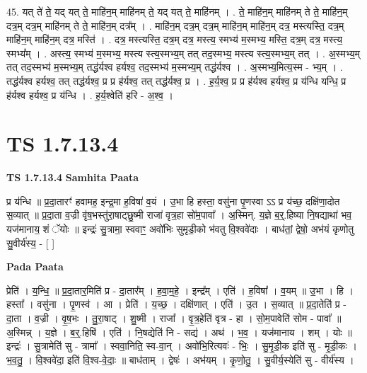 \documentclass[17pt]{extarticle}
\begin{document}
45. यत् ते॑ ते॒ यद् यत् ते॒ माहि॑न॒म् माहि॑नम् ते॒ यद् यत् ते॒ माहि॑नम् । . ते॒ माहि॑न॒म् माहि॑नम् ते ते॒ माहि॑न॒म् दत्र॒म् दत्र॒म् माहि॑नम् ते ते॒ माहि॑न॒म् दत्र᳚म् । . माहि॑न॒म् दत्र॒म् दत्र॒म् माहि॑न॒म् माहि॑न॒म् दत्र॒ मस्त्यस्ति॒ दत्र॒म् माहि॑न॒म् माहि॑न॒म् दत्र॒ मस्ति॑ । . दत्र॒ मस्त्यस्ति॒ दत्र॒म् दत्र॒ मस्त्य॒ स्मभ्य॑ म॒स्मभ्य॒ मस्ति॒ दत्र॒म् दत्र॒ मस्त्य॒ स्मभ्य᳚म् । . अस्त्य॒ स्मभ्य॑ म॒स्मभ्य॒ मस्त्य स्त्य॒स्मभ्य॒म् तत् तद॒स्मभ्य॒ मस्त्य स्त्य॒स्मभ्य॒म् तत् । . अ॒स्मभ्य॒म् तत् तद॒स्मभ्य॑ म॒स्मभ्य॒म् तद्ध॑र्यश्व हर्यश्व॒ तद॒स्मभ्य॑ म॒स्मभ्य॒म् तद्ध॑र्यश्व । . अ॒स्मभ्य॒मित्य॒स्म - भ्य॒म् । . तद्ध॑र्यश्व हर्यश्व॒ तत् तद्ध॑र्यश्व॒ प्र प्र ह॑र्यश्व॒ तत् तद्ध॑र्यश्व॒ प्र । . ह॒र्य॒श्व॒ प्र प्र ह॑र्यश्व हर्यश्व॒ प्र य॑न्धि यन्धि॒ प्र ह॑र्यश्व हर्यश्व॒ प्र य॑न्धि । . ह॒र्य॒श्वेति॑ हरि - अ॒श्व॒ । \newline
\pagebreak
{}

\section{ TS 1.7.13.4 }

\textbf{TS 1.7.13.4 } \newline
\textbf{Samhita Paata} \newline

प्र य॑न्धि ॥ प्र॒दा॒तारꣳ॑ हवामह॒ इन्द्र॒मा ह॒विषा॑ व॒यं । उ॒भा हि हस्ता॒ वसु॑ना पृ॒णस्वा ऽऽ प्र य॑च्छ॒ दक्षि॑णा॒दोत स॒व्यात् ॥ प्र॒दा॒ता व॒ज्री वृ॑ष॒भस्तु॑रा॒षाट्छु॒ष्मी राजा॑ वृत्र॒हा सो॑म॒पावा᳚ । अ॒स्मिन्. य॒ज्ञे ब॒र्॒.हिष्या नि॒षद्याथा॑ भव॒ यज॑मानाय॒ शं ॅयोः ॥ इन्द्रः॑ सु॒त्रामा॒ स्ववाꣳ॒॒ अवो॑भिः सुमृडी॒को भ॑वतु वि॒श्ववे॑दाः । बाध॑तां॒ द्वेषो॒ अभ॑यं कृणोतु सु॒वीर्य॑स्य॒ - [ ] \newline

\textbf{Pada Paata} \newline

प्रेति॑ । य॒न्धि॒ ॥ प्र॒दा॒तार॒मिति॑ प्र - दा॒तार᳚म् । ह॒वा॒म॒हे॒ । इन्द्र᳚म् । एति॑ । ह॒विषा᳚ । व॒यम् ॥ उ॒भा । हि । हस्ता᳚ । वसु॑ना । पृ॒णस्व॑ । आ । प्रेति॑ । य॒च्छ॒ । दक्षि॑णात् । एति॑ । उ॒त । स॒व्यात् ॥ प्र॒दा॒तेति॑ प्र - दा॒ता । व॒ज्री । वृ॒ष॒भः । तु॒रा॒षाट् । शु॒ष्मी । राजा᳚ । वृ॒त्र॒हेति॑ वृत्र - हा । सो॒म॒पावेति॑ सोम - पावा᳚ ॥ अ॒स्मिन्न् । य॒ज्ञे । ब॒र्॒.हिषि॑ । एति॑ । नि॒षद्येति॑ नि - सद्य॑ । अथ॑ । भ॒व॒ । यज॑मानाय । शम् । योः ॥ इन्द्रः॑ । सु॒त्रामेति॑ सु - त्रामा᳚ । स्ववा॒निति॒ स्व-वा॒न् । अवो॑भि॒रित्यवः॑ - भिः॒ । सु॒मृ॒डी॒क इति॑ सु - मृ॒डी॒कः । भ॒व॒तु॒ । वि॒श्ववे॑दा॒ इति॑ वि॒श्व-वे॒दाः॒ ॥ बाध॑ताम् । द्वेषः॑ । अभ॑यम् । कृ॒णो॒तु॒ । सु॒वीर्य॒स्येति॑ सु - वीर्य॑स्य ।  \newline
\end{document}

